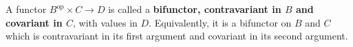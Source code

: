 A functor $B^{\text{op}} \times C \to D$ is called a \textbf{bifunctor, contravariant in $B$ and covariant in $C$}, with values in $D$. Equivalently, it is a bifunctor on $B$ and $C$ which is contravariant in its first argument and covariant in its second argument.

